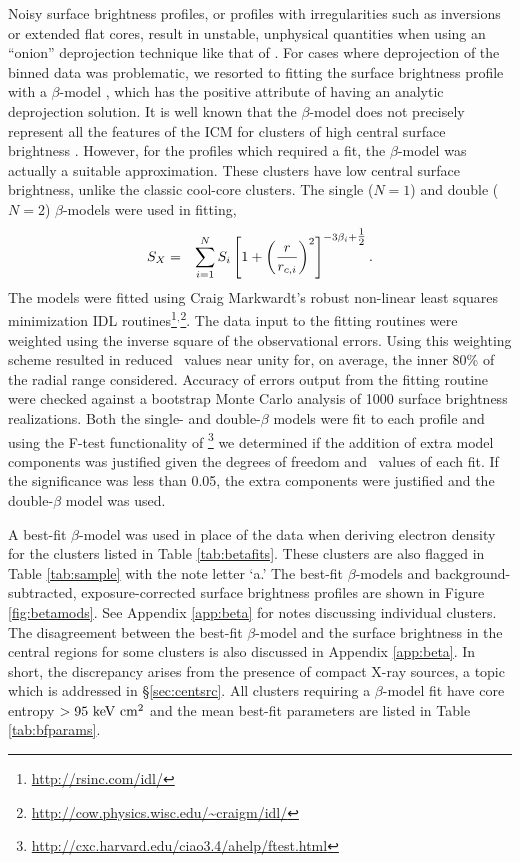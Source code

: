 \documentclass[12pt,preprint]{aastex}
\begin{document}
Noisy surface brightness profiles, or profiles with irregularities
such as inversions or extended flat cores, result in unstable,
unphysical quantities when using an ``onion'' deprojection technique
like that of \citet{kriss83}. For cases where deprojection of the
binned data was problematic, we resorted to fitting the surface
brightness profile with a $\beta$-model \citep{betamodel}, which has
the positive attribute of having an analytic deprojection solution. It
is well known that the $\beta$-model does not precisely represent all
the features of the ICM for clusters of high central surface
brightness \citep{2000MNRAS.311..313E, 2002ApJ...579..571L,
  2007ApJ...665..911H}. However, for the profiles which required a
fit, the $\beta$-model was actually a suitable approximation. These
clusters have low central surface brightness, unlike the classic
cool-core clusters. The single ($N=1$) and double ($N=2$)
$\beta$-models were used in fitting,
\begin{eqnarray}
S_X &=& \displaystyle\sum_{i=1}^N S_i
\left[1+\left(\frac{r}{r_{c,i}}\right)^2\right]^{-3\beta_i+\mbox{$\frac{1}{2}$}}.
\end{eqnarray}
The models were fitted using Craig Markwardt's robust non-linear least
squares minimization IDL
routines\footnote{\url{http://rsinc.com/idl/}}$^{,}$\footnote{\url{http://cow.physics.wisc.edu/~craigm/idl/}}. The
data input to the fitting routines were weighted using the inverse
square of the observational errors. Using this weighting scheme
resulted in reduced \chisq\ values near unity for, on average, the
inner 80\% of the radial range considered. Accuracy of errors output
from the fitting routine were checked against a bootstrap Monte Carlo
analysis of 1000 surface brightness realizations. Both the single- and
double-$\beta$ models were fit to each profile and using the F-test
functionality of
\sherpa\footnote{\url{http://cxc.harvard.edu/ciao3.4/ahelp/ftest.html}}
we determined if the addition of extra model components was justified
given the degrees of freedom and \chisq\ values of each fit. If the
significance was less than 0.05, the extra components were justified
and the double-$\beta$ model was used.

A best-fit $\beta$-model was used in place of the data when deriving
electron density for the clusters listed in Table
\ref{tab:betafits}. These clusters are also flagged in Table
\ref{tab:sample} with the note letter `a.' The best-fit $\beta$-models
and background-subtracted, exposure-corrected surface brightness
profiles are shown in Figure \ref{fig:betamods}. See Appendix
\ref{app:beta} for notes discussing individual clusters. The
disagreement between the best-fit $\beta$-model and the surface
brightness in the central regions for some clusters is also discussed
in Appendix \ref{app:beta}. In short, the discrepancy arises from the
presence of compact X-ray sources, a topic which is addressed in
\S\ref{sec:centsrc}. All clusters requiring a $\beta$-model fit have
core entropy $> 95 \mathrm{\mbox{\ensuremath{\mathrm{~keV}}} \mathrm{\mbox{\ensuremath{\mathrm{~cm}}}^2}}$ and the mean best-fit parameters are listed
in Table \ref{tab:bfparams}.
\end{document}
